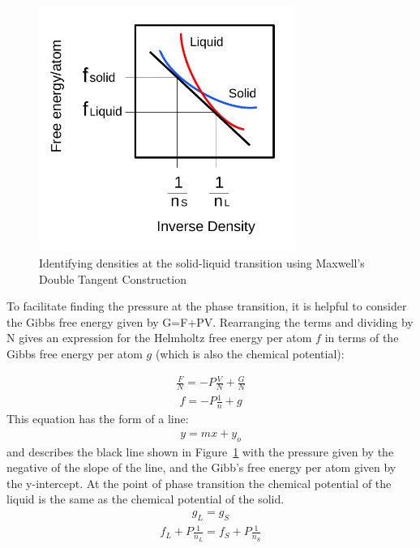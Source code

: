 \documentclass[double,12pt]{beavtex}
\begin{document}
\begin{figure}[h!]
    \centering
     \includegraphics[height=8cm]{figs/MaxwellDTC-Fig1.pdf}
    \caption{Identifying densities at the solid-liquid transition using 
    Maxwell's Double Tangent Construction}
    \label{fig:MaxwellDT}
  \end{figure}

To facilitate finding the pressure at the phase transition, 
it is helpful to consider the Gibbs free energy given by G=F+PV. 
Rearranging the terms and dividing by N gives an  expression for the 
Helmholtz free energy per atom $f$ in terms of the Gibbs free energy 
per atom  $g$ (which is also the chemical potential):  

\begin{align}{\frac{F}{N}=-P\frac{V}{N}+\frac{G}{N}}\end{align} 
\begin{align}{f=-P\frac{1}{n}+g}\end{align}
This equation has the form of a line:
\begin{align}{y=mx+y_o}\end{align}
and describes the black line shown in Figure~\ref{fig:MaxwellDT} with the 
pressure given by the negative of the slope of the line, and the Gibb's 
free energy per atom given by the y-intercept. 
At the point of phase transition the chemical potential of the liquid is 
the same as the chemical potential of the solid.
\begin{align}{g_L=g_S}\end{align} 
\begin{align}{f_L+P\frac{1}{n_L}=f_S+P\frac{1}{n_S}}\end{align}
\end{document}
